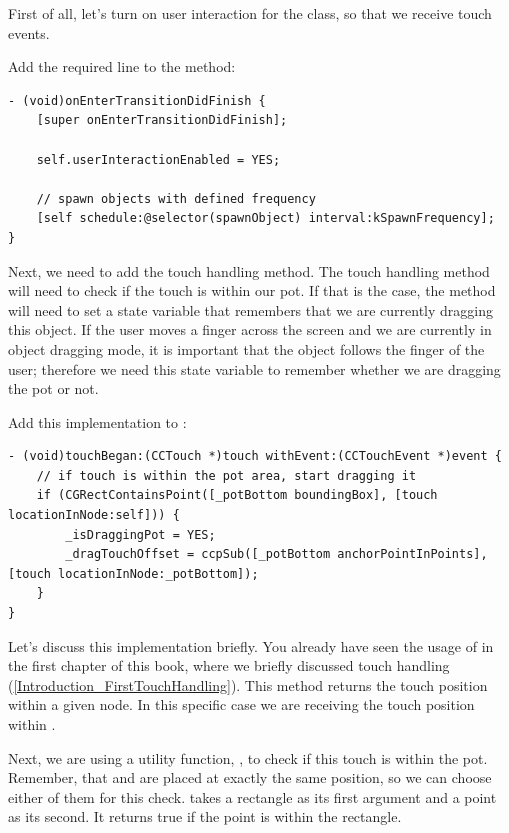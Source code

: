 First of all, let's turn on user interaction for the 
class, so that we receive touch events.

\begin{leftbar}
Add the required line to the  method:
\begin{lstlisting}
- (void)onEnterTransitionDidFinish {
    [super onEnterTransitionDidFinish];
    
    self.userInteractionEnabled = YES;
    
    // spawn objects with defined frequency
    [self schedule:@selector(spawnObject) interval:kSpawnFrequency];
}
\end{lstlisting}
\end{leftbar}

Next, we need to add the touch handling method. The touch handling method will
need to check if the touch is within our pot. If that is the case, the method
will need to set a state variable that remembers that we are currently dragging
this object. If the user moves a finger across the screen and we are currently
in object dragging mode, it is important that the object follows the finger of
the user; therefore we need this state variable to remember whether we are
dragging the pot or not.

\begin{leftbar}
Add this implementation to :
\begin{lstlisting}
- (void)touchBegan:(CCTouch *)touch withEvent:(CCTouchEvent *)event {
    // if touch is within the pot area, start dragging it
    if (CGRectContainsPoint([_potBottom boundingBox], [touch locationInNode:self])) {
        _isDraggingPot = YES;
        _dragTouchOffset = ccpSub([_potBottom anchorPointInPoints], [touch locationInNode:_potBottom]);
    }
}
\end{lstlisting}
\end{leftbar}

Let's discuss this implementation briefly. You already have seen the usage of 
 in the first chapter of this book,
where we briefly discussed touch handling
(\ref{Introduction_FirstTouchHandling}). This method returns the touch position
within a given node. In this specific case we are receiving the touch position
within .

Next, we are using a utility function, , to
check if this touch is within the pot. Remember,
that  and  are placed at exactly
the same position, so we can choose either of them for this check.
 takes a rectangle as its first argument and a
point as its second. It returns true if the point is within the rectangle.

